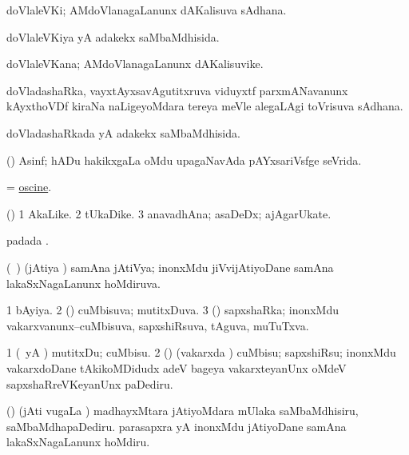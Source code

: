 \bentry
{}
\gl{\nA}
\bmng
doVlaleVKi; AMdoVlanagaLanunx dAKalisuva sAdhana. 
\emng
\eentry

\bentry
{}
\gl{\gu}
\bmng
doVlaleVKiya yA adakekx saMbaMdhisida. 
\emng
\eentry

\bentry
{}
\gl{\nA}
\bmng
doVlaleVKana; AMdoVlanagaLanunx dAKalisuvike. 
\emng
\eentry

\bentry
{}
\gl{\nA}
\bmng
doVladashaRka, vayxtAyxsavAgutitxruva viduyxtf parxmANavanunx kAyxthoVDf kiraNa naLigeyoMdara tereya meVle alegaLAgi toVrisuva sAdhana. 
\emng
\eentry

\bentry
{}
\gl{\gu}
\bmng
doVladashaRkada yA adakekx saMbaMdhisida. 
\emng
\eentry

\bentry
{}
\gl{\gu}
\bmng
(\pArxvi) Asinf; hADu hakikxgaLa oMdu upagaNavAda pAYxsariVsfge seVrida. 
\emng
\eentry

\bentry
{}
\gl{\gu}
\bmng
= \hyperlink{oscine}{oscine}. 
\emng
\eentry

\bentry
{}
\gl{\nA}
\bmng
(\aupa) 
\bnum
\num{1} AkaLike. 
\num{2} tUkaDike. 
\num{3} anavadhAna; asaDeDx; ajAgarUkate. 
\enum
\emng
\eentry

\bentry
{}
\gl{\nA}
\bmng
{} padada \bava. 
\emng
\eentry

\bentry
{}
\gl{\gu}
\bmng
(\kanmu\ \jiVvi) (jAtiya \vi) samAna jAtiVya; inonxMdu jiVvijAtiyoDane samAna lakaSxNagaLanunx hoMdiruva. 
\emng
\eentry

\bentry
{}
\gl{\gu}
\bmng
\bnum
\num{1} bAyiya. 
\num{2} (\hA) cuMbisuva; mutitxDuva. 
\num{3} (\jAyx) sapxshaRka; inonxMdu vakarxvanunx--cuMbisuva, sapxshiRsuva, tAguva, muTuTxva. 
\enum
\emng
\eentry

\bentry
{}
\gl{\sakirx}
\bmng
\bnum
\num{1} (\pArxparx\ yA \hA) mutitxDu; cuMbisu. 
\num{2} (\jAyx) (vakarxda \vi) cuMbisu; sapxshiRsu; inonxMdu vakarxdoDane tAkikoMDidudx adeV bageya vakarxteyanUnx oMdeV sapxshaRreVKeyanUnx paDediru. 
\enum
\emng

\noindent
\gl{\akirx}
\bmng
(\jiVvi) (jAti \mo vugaLa \vi) 
\banum
{} madhayxMtara jAtiyoMdara mUlaka saMbaMdhisiru, saMbaMdhapaDediru. 
 parasapxra yA inonxMdu jAtiyoDane samAna lakaSxNagaLanunx hoMdiru. 
\eanum
\emng
\eentry

